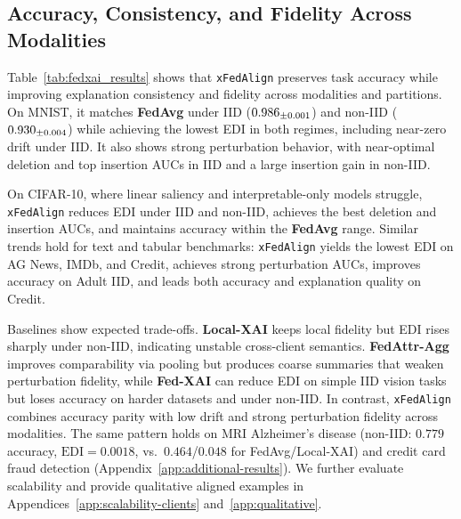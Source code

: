 \documentclass{article}
\newcommand{\meanstd}[2]{#1\textsubscript{\scriptsize$\pm$#2}}
\theoremstyle{plain}
\theoremstyle{definition}
\theoremstyle{remark}
\begin{document}
\subsection{Accuracy, Consistency, and Fidelity Across Modalities}

Table~\ref{tab:fedxai_results} shows that \texttt{xFedAlign} preserves task accuracy while improving explanation consistency and fidelity across modalities and partitions. On MNIST, it matches \textbf{FedAvg} under IID (\(\meanstd{0.986}{0.001}\)) and non-IID (\(\meanstd{0.930}{0.004}\)) while achieving the lowest EDI in both regimes, including near-zero drift under IID. It also shows strong perturbation behavior, with near-optimal deletion and top insertion AUCs in IID and a large insertion gain in non-IID.

On CIFAR-10, where linear saliency and interpretable-only models struggle, \texttt{xFedAlign} reduces EDI under IID and non-IID, achieves the best deletion and insertion AUCs, and maintains accuracy within the \textbf{FedAvg} range. Similar trends hold for text and tabular benchmarks: \texttt{xFedAlign} yields the lowest EDI on AG News, IMDb, and Credit, achieves strong perturbation AUCs, improves accuracy on Adult IID, and leads both accuracy and explanation quality on Credit.

Baselines show expected trade-offs. \textbf{Local-XAI} keeps local fidelity but EDI rises sharply under non-IID, indicating unstable cross-client semantics. \textbf{FedAttr-Agg} improves comparability via pooling but produces coarse summaries that weaken perturbation fidelity, while \textbf{Fed-XAI} can reduce EDI on simple IID vision tasks but loses accuracy on harder datasets and under non-IID. In contrast, \texttt{xFedAlign} combines accuracy parity with low drift and strong perturbation fidelity across modalities. The same pattern holds on MRI Alzheimer's disease (non-IID: $0.779$ accuracy, $\mathrm{EDI}=0.0018$, vs.\ $0.464$/$0.048$ for FedAvg/Local-XAI) and credit card fraud detection (Appendix~\ref{app:additional-results}). We further evaluate scalability and provide qualitative aligned examples in Appendices~\ref{app:scalability-clients} and~\ref{app:qualitative}.
\end{document}
